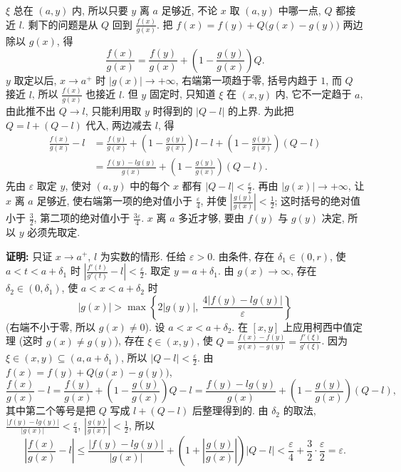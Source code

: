 \documentclass[UTF8,openany]{ctexbook}
\theoremstyle{chinesetextbook}
\newenvironment{cnproof}{\par\indent\textbf{证明:} \ignorespaces}{\par}
\begin{document}
$\xi$ 总在 $(a,y)$ 内, 所以只要 $y$ 离 $a$ 足够近, 不论 $x$ 取 $(a,y)$ 中哪一点, $Q$ 都接近 $l$. 剩下的问题是从 $Q$ 回到 $\displaystyle\frac{f(x)}{g(x)}$. 把 $f(x)=f(y)+Q\bigl(g(x)-g(y)\bigr)$ 两边除以 $g(x)$, 得
\[
\frac{f(x)}{g(x)}=\frac{f(y)}{g(x)}+\left(1-\frac{g(y)}{g(x)}\right)Q.
\]
$y$ 取定以后, $x\to a^+$ 时 $|g(x)|\to+\infty$, 右端第一项趋于零, 括号内趋于 $1$, 而 $Q$ 接近 $l$, 所以 $\displaystyle\frac{f(x)}{g(x)}$ 也接近 $l$. 但 $y$ 固定时, 只知道 $\xi$ 在 $(x,y)$ 内, 它不一定趋于 $a$, 由此推不出 $Q\to l$, 只能利用取 $y$ 时得到的 $|Q-l|$ 的上界. 为此把 $Q=l+(Q-l)$ 代入, 两边减去 $l$, 得
\[
\begin{aligned}
\frac{f(x)}{g(x)}-l&=\frac{f(y)}{g(x)}+\left(1-\frac{g(y)}{g(x)}\right)l-l+\left(1-\frac{g(y)}{g(x)}\right)(Q-l)\\
&=\frac{f(y)-lg(y)}{g(x)}+\left(1-\frac{g(y)}{g(x)}\right)(Q-l).
\end{aligned}
\]
先由 $\varepsilon$ 取定 $y$, 使对 $(a,y)$ 中的每个 $x$ 都有 $\displaystyle|Q-l|<\frac\varepsilon2$. 再由 $|g(x)|\to+\infty$, 让 $x$ 离 $a$ 足够近, 使右端第一项的绝对值小于 $\displaystyle\frac\varepsilon4$, 并使 $\displaystyle\left|\frac{g(y)}{g(x)}\right|<\frac12$; 这时括号的绝对值小于 $\displaystyle\frac32$, 第二项的绝对值小于 $\displaystyle\frac{3\varepsilon}4$. $x$ 离 $a$ 多近才够, 要由 $f(y)$ 与 $g(y)$ 决定, 所以 $y$ 必须先取定.
\begin{cnproof}
只证 $x\to a^+$, $l$ 为实数的情形. 任给 $\varepsilon>0$. 由条件, 存在 $\delta_1\in(0,r)$, 使 $a<t<a+\delta_1$ 时 $\displaystyle\left|\frac{f'(t)}{g'(t)}-l\right|<\frac\varepsilon2$. 取定 $y=a+\delta_1$. 由 $g(x)\to\infty$, 存在 $\delta_2\in(0,\delta_1)$, 使 $a<x<a+\delta_2$ 时
\[
|g(x)|>\max\left\{2|g(y)|,\ \frac{4|f(y)-lg(y)|}\varepsilon\right\}
\]
(右端不小于零, 所以 $g(x)\ne0$). 设 $a<x<a+\delta_2$. 在 $[x,y]$ 上应用柯西中值定理 (这时 $g(x)\ne g(y)$), 存在 $\xi\in(x,y)$, 使 $\displaystyle Q=\frac{f(x)-f(y)}{g(x)-g(y)}=\frac{f'(\xi)}{g'(\xi)}$. 因为 $\xi\in(x,y)\subseteq(a,a+\delta_1)$, 所以 $\displaystyle|Q-l|<\frac\varepsilon2$. 由 $f(x)=f(y)+Q\bigl(g(x)-g(y)\bigr)$,
\[
\frac{f(x)}{g(x)}-l=\frac{f(y)}{g(x)}+\left(1-\frac{g(y)}{g(x)}\right)Q-l=\frac{f(y)-lg(y)}{g(x)}+\left(1-\frac{g(y)}{g(x)}\right)(Q-l),
\]
其中第二个等号是把 $Q$ 写成 $l+(Q-l)$ 后整理得到的. 由 $\delta_2$ 的取法, $\displaystyle\frac{|f(y)-lg(y)|}{|g(x)|}<\frac\varepsilon4$, $\displaystyle\left|\frac{g(y)}{g(x)}\right|<\frac12$, 所以
\[
\left|\frac{f(x)}{g(x)}-l\right|\le\frac{|f(y)-lg(y)|}{|g(x)|}+\left(1+\left|\frac{g(y)}{g(x)}\right|\right)|Q-l|<\frac\varepsilon4+\frac32\cdot\frac\varepsilon2=\varepsilon.
\]
\end{cnproof}
\end{document}

